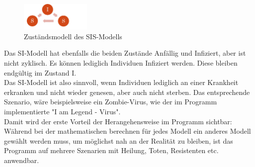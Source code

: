 \begin{figure}
\centering
\includegraphics[width= 0.3\textwidth]{./images/SIS-Modell.jpg}\caption{Zuständsmodell des SIS-Modells}
\end{figure}
Das SI-Modell hat ebenfalls die beiden Zustände Anfällig und Infiziert, aber ist nicht zyklisch. Es können lediglich Individuen Infiziert werden. Diese bleiben endgültig im Zustand I.\\ 
Das SI-Modell ist also sinnvoll, wenn Individuen lediglich an einer Krankheit erkranken und nicht wieder genesen, aber auch nicht sterben. Das entsprechende Szenario, wäre beispielsweise ein Zombie-Virus, wie der im Programm implementierte "I am Legend - Virus".\\
Damit wird der erste Vorteil der Herangehensweise im Programm sichtbar: Während bei der mathematischen berechnen für jedes Modell ein anderes Modell gewählt werden muss, um möglichst nah an der Realität zu bleiben, ist das Programm auf mehrere Szenarien mit Heilung, Toten, Resistenten etc. anwendbar.